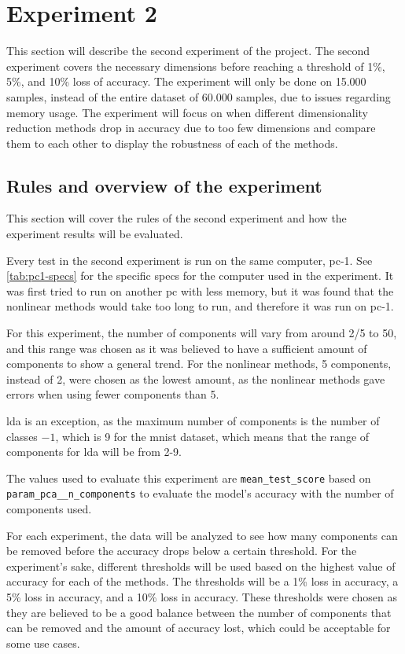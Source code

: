 \section{Experiment 2}\label{sec:experiment-2}
This section will describe the second experiment of the project. The second experiment covers the necessary dimensions before reaching a threshold of 1\%, 5\%, and 10\% loss of accuracy. The experiment will only be done on 15.000 samples, instead of the entire dataset of 60.000 samples, due to issues regarding memory usage. The experiment will focus on when different dimensionality reduction methods drop in accuracy due to too few dimensions and compare them to each other to display the robustness of each of the methods.


\subsection{Rules and overview of the experiment}\label{subsec:experiment_2_rules}
This section will cover the rules of the second experiment and how the experiment results will be evaluated.

Every test in the second experiment is run on the same computer, pc-1. See \autoref{tab:pc1-specs} for the specific specs for the computer used in the experiment. It was first tried to run on another pc with less memory, but it was found that the nonlinear methods would take too long to run, and therefore it was run on pc-1.

For this experiment, the number of components will vary from around 2/5 to 50, and this range was chosen as it was believed to have a sufficient amount of components to show a general trend. For the nonlinear methods, 5 components, instead of 2, were chosen as the lowest amount, as the nonlinear methods gave errors when using fewer components than 5.

\gls{lda} is an exception, as the maximum number of components is the number of classes $-1$, which is 9 for the \gls{mnist} dataset, which means that the range of components for \gls{lda} will be from 2-9.

The values used to evaluate this experiment are \texttt{mean\_test\_score} based on \texttt{param\_pca\_\_n\_components} to evaluate the model's accuracy with the number of components used.

For each experiment, the data will be analyzed to see how many components can be removed before the accuracy drops below a certain threshold. For the experiment's sake, different thresholds will be used based on the highest value of accuracy for each of the methods. The thresholds will be a 1\% loss in accuracy, a 5\% loss in accuracy, and a 10\% loss in accuracy. These thresholds were chosen as they are believed to be a good balance between the number of components that can be removed and the amount of accuracy lost, which could be acceptable for some use cases.


